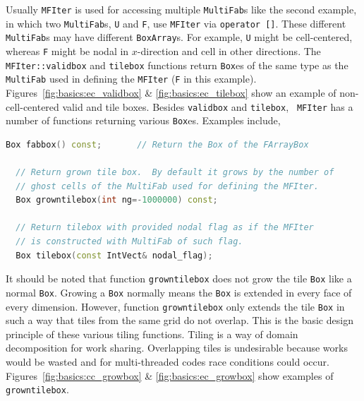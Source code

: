 {{Usually {\tt MFIter} is used for accessing multiple {\tt MultiFab}s
like the second example, in which two {\tt MultiFab}s, {\tt U} and
{\tt F}, use {\tt MFIter} via {\tt operator []}.  These different {\tt
  MultiFab}s may have different {\tt BoxArray}s.  For example, {\tt U}
might be cell-centered, whereas {\tt F} might be nodal in
$x$-direction and cell in other directions.  The {\tt
  MFIter::validbox} and {\tt tilebox} functions return {\tt Box}es of
the same type as the {\tt MultiFab} used in defining the {\tt MFIter}
({\tt F} in this example).  Figures~\ref{fig:basics:ec_validbox} \&
\ref{fig:basics:ec_tilebox} show an example of non-cell-centered valid
and tile boxes.  Besides {\tt validbox} and {\tt tilebox}, {\tt
  MFIter} has a number of functions returning various {\tt Box}es.
Examples include,
\begin{lstlisting}[language=cpp]
  Box fabbox() const;       // Return the Box of the FArrayBox

  // Return grown tile box.  By default it grows by the number of
  // ghost cells of the MultiFab used for defining the MFIter.
  Box growntilebox(int ng=-1000000) const;

  // Return tilebox with provided nodal flag as if the MFIter
  // is constructed with MultiFab of such flag.
  Box tilebox(const IntVect& nodal_flag); 
\end{lstlisting} 
It should be noted that function {\tt growntilebox} does not grow the
tile {\tt Box} like a normal {\tt Box}.  Growing a {\tt Box} normally
means the {\tt Box} is extended in every face of every dimension.
However, function {\tt growntilebox} only extends the tile {\tt Box}
in such a way that tiles from the same grid do not overlap.  This is
the basic design principle of these various tiling functions.  Tiling
is a way of domain decomposition for work sharing.  Overlapping tiles
is undesirable because works would be wasted and for multi-threaded
codes race conditions could occur.
Figures~\ref{fig:basics:cc_growbox} \& \ref{fig:basics:ec_growbox}
show examples of {\tt growntilebox}.

}}
